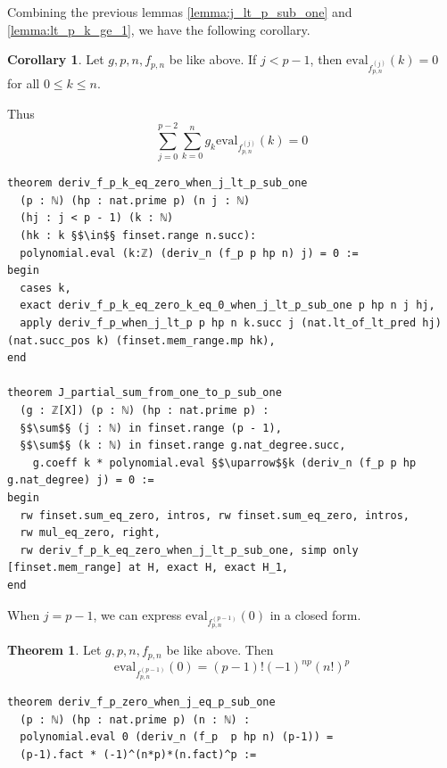 \documentclass{report}
\theoremstyle{definition}
\newtheorem{theorem}{Theorem}[section]
\newtheorem{corollary}{Corollary}[section]
\begin{document}
Combining the previous lemmas \ref{lemma:j_lt_p_sub_one} and \ref{lemma:lt_p_k_ge_1}, we have the following corollary.
\begin{corollary}\label{cor:part1}
Let $g,p,n,f_{p,n}$ be like above. If $j < p-1$, then $\mathrm{eval}_{f_{p,n}^{(j)}}(k) = 0$ for all $0\le k\le n$.

Thus
$$
\sum_{j=0}^{p-2}\sum_{k=0}^n g_k\mathrm{eval}_{f_{p,n}^{(j)}}(k)=0
$$
\begin{verbatim}
theorem deriv_f_p_k_eq_zero_when_j_lt_p_sub_one 
  (p : ℕ) (hp : nat.prime p) (n j : ℕ) 
  (hj : j < p - 1) (k : ℕ) 
  (hk : k §$\in$§ finset.range n.succ): 
  polynomial.eval (k:ℤ) (deriv_n (f_p p hp n) j) = 0 :=
begin
  cases k, 
  exact deriv_f_p_k_eq_zero_k_eq_0_when_j_lt_p_sub_one p hp n j hj,
  apply deriv_f_p_when_j_lt_p p hp n k.succ j (nat.lt_of_lt_pred hj) (nat.succ_pos k) (finset.mem_range.mp hk),
end

theorem J_partial_sum_from_one_to_p_sub_one 
  (g : ℤ[X]) (p : ℕ) (hp : nat.prime p) : 
  §$\sum$§ (j : ℕ) in finset.range (p - 1),
  §$\sum$§ (k : ℕ) in finset.range g.nat_degree.succ,
    g.coeff k * polynomial.eval §$\uparrow$§k (deriv_n (f_p p hp g.nat_degree) j) = 0 :=
begin
  rw finset.sum_eq_zero, intros, rw finset.sum_eq_zero, intros,
  rw mul_eq_zero, right, 
  rw deriv_f_p_k_eq_zero_when_j_lt_p_sub_one, simp only [finset.mem_range] at H, exact H, exact H_1,
end
\end{verbatim}
\end{corollary}

When $j=p-1$, we can express $\mathrm{eval}_{f_{p,n}^{(p-1)}}(0)$ in a closed form.
\begin{theorem}\label{thm:f_p_psub1_deriv_0}
Let $g,p,n,f_{p,n}$ be like above. Then 
$$\mathrm{eval}_{f_{p,n}^{(p-1)}}(0)=(p-1)!(-1)^{np}(n!)^p$$
\begin{verbatim}
theorem deriv_f_p_zero_when_j_eq_p_sub_one 
  (p : ℕ) (hp : nat.prime p) (n : ℕ) : 
  polynomial.eval 0 (deriv_n (f_p  p hp n) (p-1)) = 
  (p-1).fact * (-1)^(n*p)*(n.fact)^p :=
\end{verbatim}
\end{theorem}
\end{document}

